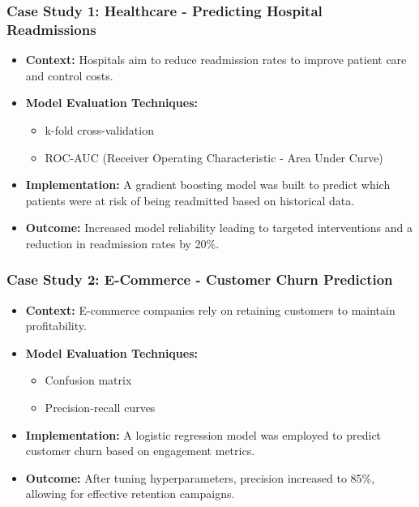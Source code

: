 \documentclass[aspectratio=169]{beamer}
\begin{document}
\begin{frame}[fragile]
    \frametitle{Case Study 1: Healthcare - Predicting Hospital Readmissions}
    \begin{itemize}
        \item \textbf{Context:} Hospitals aim to reduce readmission rates to improve patient care and control costs.
        \item \textbf{Model Evaluation Techniques:}
        \begin{itemize}
            \item k-fold cross-validation
            \item ROC-AUC (Receiver Operating Characteristic - Area Under Curve)
        \end{itemize}
        \item \textbf{Implementation:} A gradient boosting model was built to predict which patients were at risk of being readmitted based on historical data.
        \item \textbf{Outcome:} Increased model reliability leading to targeted interventions and a reduction in readmission rates by 20\%.
    \end{itemize}
\end{frame}

\begin{frame}[fragile]
    \frametitle{Case Study 2: E-Commerce - Customer Churn Prediction}
    \begin{itemize}
        \item \textbf{Context:} E-commerce companies rely on retaining customers to maintain profitability.
        \item \textbf{Model Evaluation Techniques:}
        \begin{itemize}
            \item Confusion matrix
            \item Precision-recall curves
        \end{itemize}
        \item \textbf{Implementation:} A logistic regression model was employed to predict customer churn based on engagement metrics.
        \item \textbf{Outcome:} After tuning hyperparameters, precision increased to 85\%, allowing for effective retention campaigns.
    \end{itemize}
\end{frame}
\end{document}
